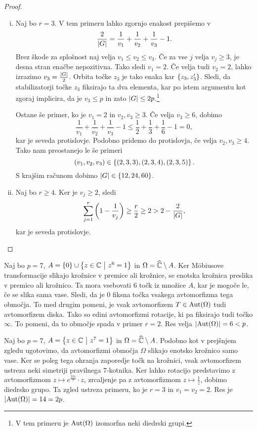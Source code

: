\begin{proof}
\begin{enumerate}[i)]
\item Naj bo $r = 3$. V tem primeru lahko zgornjo enakost prepišemo
v
\[
\frac{2}{\left\lvert G\right\rvert} =
\frac{1}{v_1} + \frac{1}{v_2} + \frac{1}{v_3} - 1.
\]
Brez škode za splošnost naj velja $v_1 \leq v_2 \leq v_3$. Če za
vse $j$ velja $v_j \geq 3$, je desna stran enačbe nepozitivna. Tako
sledi $v_1 = 2$. Če velja tudi $v_2 = 2$, lahko izrazimo
$v_3 = \frac{\left\lvert G\right\rvert}{2}$. Orbita točke $z_3$ je tako enaka kar
$\left\{z_3, z_3'\right\}$. Sledi, da stabilizatorji točke $z_3$ fiksirajo
ta dva elementa, kar po istem argumentu kot zgoraj implicira, da je
$v_3 \leq p$ in zato $\left\lvert G\right\rvert \leq 2p$.\footnote{V tem primeru je
$\operatorname{Aut}(\Omega)$ izomorfna neki diedrski grupi.}

Ostane še primer, ko je $v_1 = 2$ in $v_2, v_3 \geq 3$. Če velja
$v_3 \geq 6$, dobimo
\[
\frac{1}{v_1} + \frac{1}{v_2} + \frac{1}{v_3} - 1 \leq
\frac{1}{2} + \frac{1}{3} + \frac{1}{6} - 1 = 0,
\]
kar je seveda protislovje. Podobno pridemo do protislovja, če velja
$v_2, v_3 \geq 4$. Tako nam preostanejo le še primeri
\[
(v_1, v_2, v_3) \in \left\{(2,3,3), (2,3,4), (2,3,5)\right\}.
\]
S krajšim računom dobimo $\left\lvert G\right\rvert \in \left\{12, 24, 60\right\}$.

\item Naj bo $r \geq 4$. Ker je $v_j \geq 2$, sledi
\[
\sum_{j=1}^r \left(1 - \frac{1}{v_j}\right) \geq
\frac{r}{2} \geq 2 > 2 - \frac{2}{\left\lvert G\right\rvert},
\]
kar je seveda protislovje. \qedhere
\end{enumerate}
\end{proof}

\begin{zgled}
Naj bo $p = 7$, $A = \left\{0\right\} \cup \left\{z \in \mathbb{C}~\middle\vert~z^6 = 1\right\}$ in
$\Omega = \widehat{\mathbb{C}} \setminus A$. Ker Möbiusove transformacije slikajo
krožnice v premice ali krožnice, se enotska krožnica preslika v
premico ali krožnico. Ta mora vsebovati $6$ točk iz množice $A$,
kar je mogoče le, če se slika sama vase. Sledi, da je $0$ fiksna
točka vsakega avtomorfizma tega območja. To med drugim pomeni, je
vsak avtomorfizem $T \in \operatorname{Aut}(\Omega)$ tudi avtomorfizem diska.
Tako so edini avtomorfizmi rotacije, ki pa fiksirajo tudi točko
$\infty$. To pomeni, da to območje spada v primer $r = 2$. Res
velja $\left\lvert \operatorname{Aut}(\Omega)\right\rvert = 6 < p$.
\end{zgled}

\begin{zgled}
Naj bo $p = 7$, $A = \left\{z \in \mathbb{C}~\middle\vert~z^7 = 1\right\}$ in
$\Omega = \widehat{\mathbb{C}} \setminus A$. Podobno kot v prejšnjem zgledu
ugotovimo, da avtomorfizmi območja $\Omega$ slikajo enotsko
krožnico samo vase. Ker se poleg tega ohranja zaporedje točk na
krožnici, vsak avtomorfizem ustreza neki simetriji pravilnega
$7$-kotnika. Ker lahko rotacijo predstavimo z avtomorfizmom
$z \mapsto e^{\frac{2 \pi i}{7}} \cdot z$, zrcaljenje pa z
avtomorfizmom $z \mapsto \frac{1}{z}$, dobimo diedrsko grupo. Ta
zgled ustreza primeru, ko je $r = 3$ in $v_1 = v_2 = 2$. Res je
$\left\lvert \operatorname{Aut}(\Omega)\right\rvert = 14 = 2p$.
\end{zgled}

